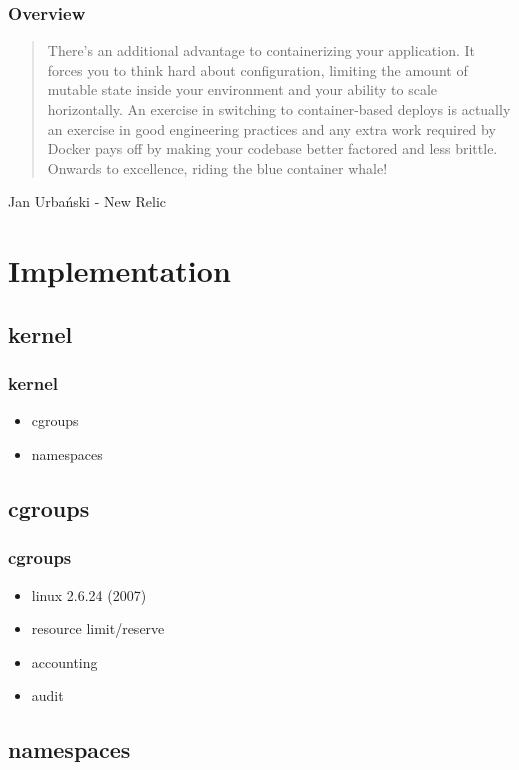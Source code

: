 \documentclass{beamer}
\begin{document}
\begin{frame}
    \frametitle{Overview}
    \begin{quote}
        There’s an additional advantage to containerizing your application. It
        forces you to think hard about configuration, limiting the amount of
        mutable state inside your environment and your ability to scale
        horizontally. An exercise in switching to container-based deploys is
        actually an exercise in good engineering practices and any extra work
        required by Docker pays off by making your codebase better factored and
        less brittle. Onwards to excellence, riding the blue container whale!
    \end{quote}
    Jan Urbański - New Relic
\end{frame}

\section{Implementation}

\subsection{kernel}

\begin{frame}
    \frametitle{kernel}
    \begin{itemize}
        \item cgroups
        \item namespaces
    \end{itemize}
\end{frame}

\subsection{cgroups}

\begin{frame}
    \frametitle{cgroups}
    \begin{itemize}
        \item linux 2.6.24 (2007)
        \item resource limit/reserve
        \item accounting
        \item audit
    \end{itemize}
\end{frame}

\subsection{namespaces}
\end{document}
